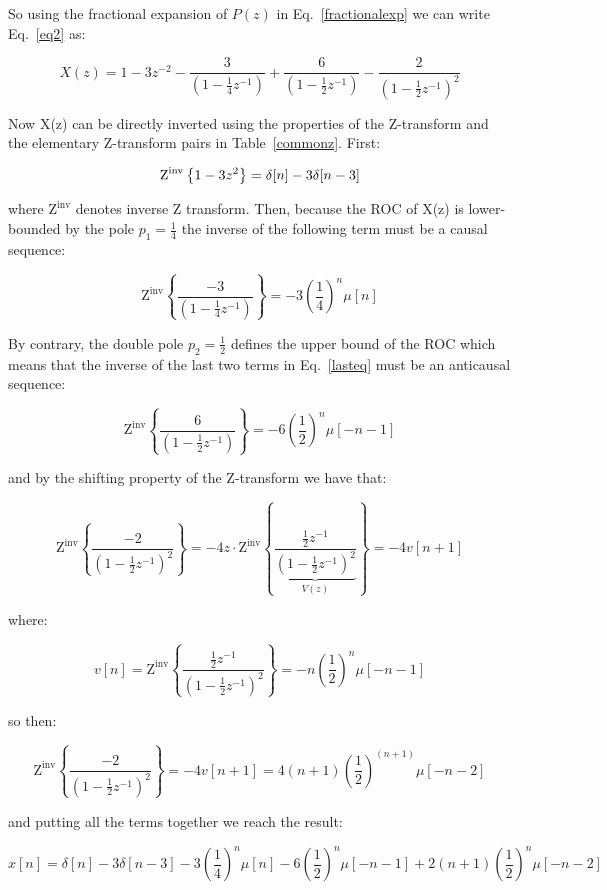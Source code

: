\documentclass[a4paper,11pt,oneside]{article}
\begin{document}
So using the fractional expansion of $P(z)$ in Eq.~\ref{fractionalexp} we can write Eq.~\ref{eq2} as:


\begin{equation}\label{lasteq}
X(z)=1-3z^{-2}-\frac{3}{(1-\frac{1}{4}z^{-1})}+\frac{6}{(1-\frac{1}{2}z^{-1})}-\frac{2}{(1-\frac{1}{2}z^{-1})^2}
\end{equation}

Now X(z) can be directly inverted using the properties of the Z-transform and the elementary Z-transform pairs in Table~\ref{commonz}. First:

\[
\textrm{Z}^{\textrm{inv}}\left\{1-3z^{2}\right\}=\delta[n]-3\delta[n-3]\\
\]

where $\textrm{Z}^{\textrm{inv}}$ denotes inverse Z transform. Then, because the ROC of X(z) is lower-bounded by the pole $p_1=\frac{1}{4}$ the inverse of the following term must be a causal sequence:

\[
\textrm{Z}^{\textrm{inv}}\left\{\frac{-3}{(1-\frac{1}{4}z^{-1})}\right\}=-3\left(\frac{1}{4}\right)^n\mu[n]
\]

By contrary, the double pole $p_2=\frac{1}{2}$ defines the upper bound of the ROC which means that the inverse of the last two terms in Eq.~\ref{lasteq} must be an anticausal sequence:

\[
\textrm{Z}^{\textrm{inv}}\left\{\frac{6}{(1-\frac{1}{2}z^{-1})}\right\}=-6\left(\frac{1}{2}\right)^n\mu[-n-1]
\]

and by the shifting property of the Z-transform we have that:

\[
\textrm{Z}^{\textrm{inv}}\left\{\frac{-2}{(1-\frac{1}{2}z^{-1})^2}\right\}=-4 z\cdot \textrm{Z}^{\textrm{inv}}\left\{\underbrace{\frac{\frac{1}{2}z^{-1}}{(1-\frac{1}{2}z^{-1})^2}}_{V(z)}\right\}=-4v[n+1]
\]

where:

\[
v[n] =  \textrm{Z}^{\textrm{inv}}\left\{\frac{\frac{1}{2}z^{-1}}{(1-\frac{1}{2}z^{-1})^2}\right\}=-n\left(\frac{1}{2}\right)^n\mu[-n-1]
\]

so then:

\[
\textrm{Z}^{\textrm{inv}}\left\{\frac{-2}{(1-\frac{1}{2}z^{-1})^2}\right\}=-4v[n+1]=4(n+1)\left(\frac{1}{2}\right)^{(n+1)}\mu[-n-2]
\]

and putting all the terms together we reach the result:

\[
x[n] =\delta[n]-3\delta[n-3]-3\left(\frac{1}{4}\right)^n\mu[n]-6\left(\frac{1}{2}\right)^n\mu[-n-1]+2(n+1)\left(\frac{1}{2}\right)^{n}\mu[-n-2]
\]
\end{document}
